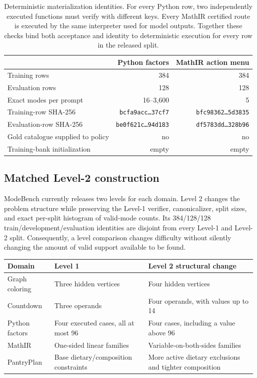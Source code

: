 \begin{table}[H]
\centering
\caption{Deterministic materialization identities. For every Python row, two
independently executed functions must verify with different keys. Every MathIR
certified route is executed by the same interpreter used for model outputs.
Together these checks bind both acceptance and identity to deterministic
execution for every row in the released split.}
\label{tab:materialization-identities}
\small
\begin{tabular}{@{}lrr@{}}
\toprule
& \textbf{Python factors} & \textbf{MathIR action menu} \\
\midrule
Training rows & 384 & 384 \\
Evaluation rows & 128 & 128 \\
Exact modes per prompt & 16--3,600 & 5 \\
Training-row SHA-256 & \texttt{bcfa9acc\ldots37cf7} & \texttt{bfc98362\ldots5d3835} \\
Evaluation-row SHA-256 & \texttt{be0f621c\ldots94d183} & \texttt{df5783dd\ldots328b96} \\
Gold catalogue supplied to policy & no & no \\
Training-bank initialization & empty & empty \\
\bottomrule
\end{tabular}
\end{table}

\subsection{Matched Level-2 construction}
\label{app:data-levels}

ModeBench currently releases two levels for each domain. Level 2 changes the
problem structure while preserving the Level-1 verifier, canonicalizer, split
sizes, and exact per-split histogram of valid-mode counts. Its 384/128/128
train/development/evaluation identities are disjoint from every Level-1 and
Level-2 split. Consequently, a level comparison changes difficulty without
silently changing the amount of valid support available to be found.

\begin{center}
\small
\begin{tabularx}{.96\linewidth}{@{}lYY@{}}
\toprule
\textbf{Domain} & \textbf{Level 1} & \textbf{Level 2 structural change} \\
\midrule
Graph coloring & Three hidden vertices & Four hidden vertices \\
Countdown & Three operands & Four operands, with values up to 14 \\
Python factors & Four executed cases, all at most 96 & Four cases, including a value above 96 \\
MathIR & One-sided linear families & Variable-on-both-sides families \\
PantryPlan & Base dietary/composition constraints & More active dietary exclusions and tighter composition \\
\bottomrule
\end{tabularx}
\end{center}

